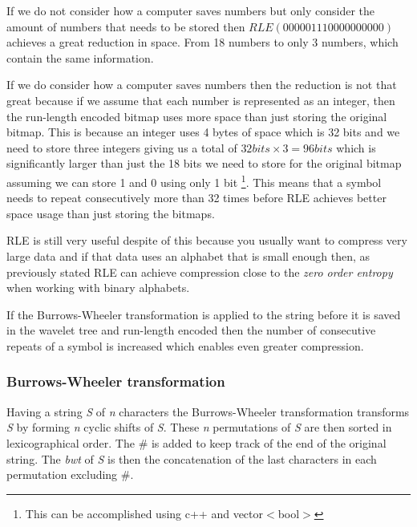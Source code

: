 If we do not consider how a computer saves numbers but only consider the amount of numbers that needs to be stored then $RLE(000001110000000000)$ achieves a great reduction in space.
From 18 numbers to only 3 numbers, which contain the same information.

If we do consider how a computer saves numbers then the reduction is not that great because if we assume that each number is represented as an integer, then the run-length encoded bitmap uses more space than just storing the original bitmap. 
This is because an integer uses 4 bytes of space which is 32 bits and we need to store three integers giving us a total of $32 bits \times 3 = 96 bits$ which is significantly larger than just the 18 bits we need to store for the original bitmap assuming we can store 1 and 0 using only 1 bit \footnote{This can be accomplished using c++ and vector$<$bool$>$}. 
This means that a symbol needs to repeat consecutively more than 32 times before RLE achieves better space usage than just storing the bitmaps.

RLE is still very useful despite of this because you usually want to compress very large data and if that data uses an alphabet that is small enough then, as previously stated RLE can achieve compression close to the \textit{zero order entropy} when working with binary alphabets.

If the Burrows-Wheeler transformation is applied to the string before it is saved in the wavelet tree and run-length encoded then the number of consecutive repeats of a symbol is increased which enables even greater compression.

\subsubsection{Burrows-Wheeler transformation}
Having a string \textit{S} of \textit{n} characters the Burrows-Wheeler transformation \citep{BWToriginalArticle} transforms \textit{S} by forming \textit{n} cyclic shifts of \textit{S}. 
These \textit{n} permutations of \textit{S} are then sorted in lexicographical order.
The \# is added to keep track of the end of the original string.
The \textit{bwt} of \textit{S} is then the concatenation of the last characters in each permutation excluding $\#$.

